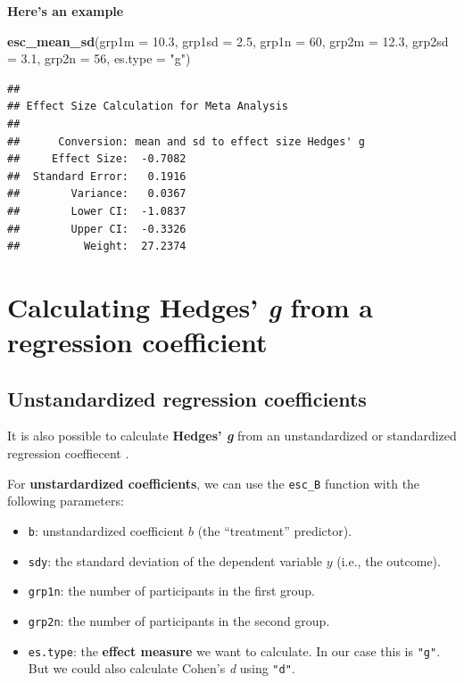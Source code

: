 \documentclass[]{book}
\newenvironment{Shaded}{\begin{snugshade}}{\end{snugshade}}
\newcommand{\DataTypeTok}[1]{\textcolor[rgb]{0.13,0.29,0.53}{#1}}
\newcommand{\DecValTok}[1]{\textcolor[rgb]{0.00,0.00,0.81}{#1}}
\newcommand{\FloatTok}[1]{\textcolor[rgb]{0.00,0.00,0.81}{#1}}
\newcommand{\KeywordTok}[1]{\textcolor[rgb]{0.13,0.29,0.53}{\textbf{#1}}}
\newcommand{\NormalTok}[1]{#1}
\newcommand{\StringTok}[1]{\textcolor[rgb]{0.31,0.60,0.02}{#1}}
\providecommand{\tightlist}{%
  \setlength{\itemsep}{0pt}\setlength{\parskip}{0pt}}
\begin{document}
\textbf{Here's an example}

\begin{Shaded}
\begin{Highlighting}[]
\KeywordTok{esc_mean_sd}\NormalTok{(}\DataTypeTok{grp1m =} \FloatTok{10.3}\NormalTok{, }\DataTypeTok{grp1sd =} \FloatTok{2.5}\NormalTok{, }\DataTypeTok{grp1n =} \DecValTok{60}\NormalTok{,}
\DataTypeTok{grp2m =} \FloatTok{12.3}\NormalTok{, }\DataTypeTok{grp2sd =} \FloatTok{3.1}\NormalTok{, }\DataTypeTok{grp2n =} \DecValTok{56}\NormalTok{, }\DataTypeTok{es.type =} \StringTok{"g"}\NormalTok{)}
\end{Highlighting}
\end{Shaded}

\begin{verbatim}
## 
## Effect Size Calculation for Meta Analysis
## 
##      Conversion: mean and sd to effect size Hedges' g
##     Effect Size:  -0.7082
##  Standard Error:   0.1916
##        Variance:   0.0367
##        Lower CI:  -1.0837
##        Upper CI:  -0.3326
##          Weight:  27.2374
\end{verbatim}

\hypertarget{b}{%
\section{\texorpdfstring{Calculating Hedges' \emph{g} from a regression coefficient}{Calculating Hedges' g from a regression coefficient}}\label{b}}

\hypertarget{unstandardized-regression-coefficients}{%
\subsection{Unstandardized regression coefficients}\label{unstandardized-regression-coefficients}}

It is also possible to calculate \textbf{Hedges' \emph{g} } from an unstandardized or standardized regression coeffiecent \citep{lipsey2001practical}.

For \textbf{unstardardized coefficients}, we can use the \texttt{esc\_B} function with the following parameters:

\begin{itemize}
\tightlist
\item
  \texttt{b}: unstandardized coefficient \(b\) (the ``treatment'' predictor).
\item
  \texttt{sdy}: the standard deviation of the dependent variable \(y\) (i.e., the outcome).
\item
  \texttt{grp1n}: the number of participants in the first group.
\item
  \texttt{grp2n}: the number of participants in the second group.
\item
  \texttt{es.type}: the \textbf{effect measure} we want to calculate. In our case this is \texttt{"g"}. But we could also calculate Cohen's \emph{d} using \texttt{"d"}.
\end{itemize}
\end{document}
